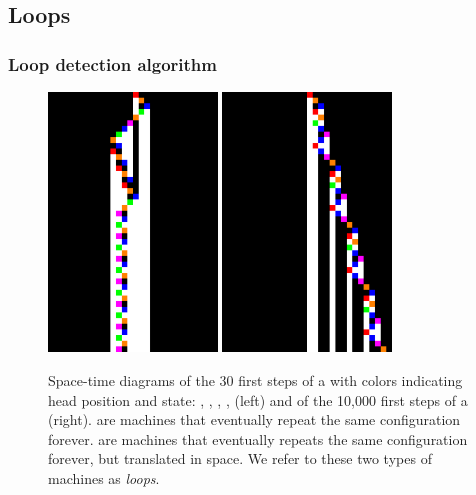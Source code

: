 
\subsection{Loops}\label{sec:loops}
\subsubsection{Loop detection algorithm}
\begin{figure}[h!]
    \centering
    \includegraphics[width=0.4\textwidth]{figures/space-time-diagrams/cycler_279081.pdf}
    \hspace{2ex}
    \includegraphics[width=0.4\textwidth]{figures/space-time-diagrams/translated_cycler_62645534.pdf}
    \caption{Space-time diagrams of the 30 first steps of a \textit{\cycler}\protect\footnotemark  with colors indicating head position and state: \stateA, \stateB, \stateC, \stateD, \stateE (left) and of the 10,000 first steps of a \textit{\TC}\protect\footnotemark (right). \cyclers are machines that eventually repeat the same configuration forever. \TCs are machines that eventually repeats the same configuration forever, but translated in space. We refer to these two types of machines as \textit{loops}.}\label{fig:loops}
\end{figure}

